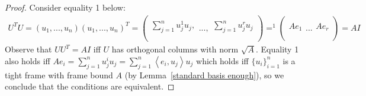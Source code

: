 \documentclass{article}
\newcommand{\Lemmaref}[1]{Lemma~\ref{#1}}
\begin{document}
\begin{proof}


Consider equality 1 below: 
\begin{align*}
    U^{T}U=\left(u_{1},...,u_{n}\right)\left(u_{1},...,u_{n}\right)^{T}=\left(\begin{array}{c}
    \\
    \sum_{j=1}^{n}u_{j}^{1}u_{j},\\
    \\
    \end{array}...,\begin{array}{c}
    \\
    \sum_{j=1}^{n}u_{j}^{r}u_{j}\\
    \\
    \end{array}\right)=^1\left(\begin{array}{c}
    \\
    Ae_{1}\\
    \\
    \end{array}...\begin{array}{c}
    \\
    Ae_{r}\\
    \\
    \end{array}\right)=AI
\end{align*}
Observe that $UU^T=AI$ iff $U$ has orthogonal columns with norm $\sqrt A$. Equality 1 also holds iff $Ae_{i}=\sum_{j=1}^{n}u_{j}^{i}u_{j}=\sum_{j=1}^{n}\left\langle e_{i},u_{j}\right\rangle u_{j}$ which holds iff $\{u_i\}_{i=1}^n$ is a tight frame with frame bound $A$ (by \Lemmaref{standard basis enough}), so we conclude that the conditions are equivalent.
\end{proof}
\end{document}
